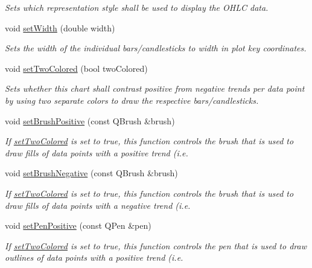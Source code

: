 \begin{DoxyCompactItemize}
\begin{DoxyCompactList}\small\item\em Sets which representation style shall be used to display the O\+H\+L\+C data. \end{DoxyCompactList}\item 
void \hyperlink{classQCPFinancial_a99633f8bac86a61d534ae5eeb1a3068f}{set\+Width} (double width)
\begin{DoxyCompactList}\small\item\em Sets the width of the individual bars/candlesticks to {\itshape width} in plot key coordinates. \end{DoxyCompactList}\item 
void \hyperlink{classQCPFinancial_a138e44aac160a17a9676652e240c5f08}{set\+Two\+Colored} (bool two\+Colored)
\begin{DoxyCompactList}\small\item\em Sets whether this chart shall contrast positive from negative trends per data point by using two separate colors to draw the respective bars/candlesticks. \end{DoxyCompactList}\item 
void \hyperlink{classQCPFinancial_a5ebff2b1764efd07cc44942e67821829}{set\+Brush\+Positive} (const Q\+Brush \&brush)
\begin{DoxyCompactList}\small\item\em If \hyperlink{classQCPFinancial_a138e44aac160a17a9676652e240c5f08}{set\+Two\+Colored} is set to true, this function controls the brush that is used to draw fills of data points with a positive trend (i.\+e. \end{DoxyCompactList}\item 
void \hyperlink{classQCPFinancial_a8bbdd87629f9144b3ef51af660c0961a}{set\+Brush\+Negative} (const Q\+Brush \&brush)
\begin{DoxyCompactList}\small\item\em If \hyperlink{classQCPFinancial_a138e44aac160a17a9676652e240c5f08}{set\+Two\+Colored} is set to true, this function controls the brush that is used to draw fills of data points with a negative trend (i.\+e. \end{DoxyCompactList}\item 
void \hyperlink{classQCPFinancial_ac58aa3adc7a35aab0088764b840683e5}{set\+Pen\+Positive} (const Q\+Pen \&pen)
\begin{DoxyCompactList}\small\item\em If \hyperlink{classQCPFinancial_a138e44aac160a17a9676652e240c5f08}{set\+Two\+Colored} is set to true, this function controls the pen that is used to draw outlines of data points with a positive trend (i.\+e. \end{DoxyCompactList}\item 

\end{DoxyCompactItemize}
